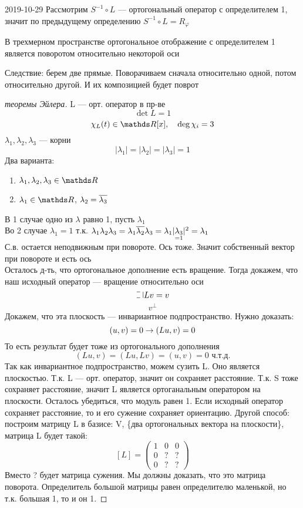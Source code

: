 \documentclass[main]{subfiles}
\begin{document}
\begin{lect}{2019-10-29}
    Рассмотрим $S^{-1} \circ L$ --- ортогональный оператор с определителем 1, значит по предыдущему определению $S^{-1} \circ L = R_{\varphi}$

    \begin{utv}
      В трехмерном пространстве ортогональное отображение с определителем 1 является поворотом относительно некоторой оси
    \end{utv}

    Следствие: берем две прямые. Поворачиваем сначала относительно одной, потом относительно другой. И их композицией будет поврот

    \begin{proof}[теоремы Эйлера]
      L --- орт. оператор в пр-ве
      \[\det L = 1\]
      \[\chi_L(t) \in \R[x],\q \deg \chi_i = 3\]
      $\lambda_1, \lambda_2, \lambda_3$ --- корни
      \[|\lambda_1| = |\lambda_2| = |\lambda_3| = 1\]
      Два варианта:
      \begin{enumerate}
        \item $\lambda_1, \lambda_2, \lambda_3 \in \R$
        \item $\lambda_1 \in \R$, $\lambda_2 = \overline{\lambda_3}$
      \end{enumerate}
      В 1 случае одно из $\lambda$ равно 1, пусть $\lambda_1$\\
      Во 2 случае $\lambda_1 = 1$ т.к. $\lambda_1 \lambda_2 \lambda_3 = \lambda_1 \overline{\lambda_2} \lambda_3 = \lambda_1 |\underset{=1}{\lambda_3}|^2 = \lambda_1$\\
      С.в. остается неподвижным при повороте. Ось тоже. Значит собственный вектор  при повороте и есть ось\\
      Осталось д-ть, что ортогональное дополнение есть вращение. Тогда докажем, что наш исходный оператор --- вращение относительно оси
      \[\letus Lv = v\]
      \[v^{\bot}\]
      Докажем, что эта плоскость --- инвариантное подпространство. Нужно доказать:
      \[(u,v) = 0 \rightarrow (Lu, v) = 0\]
      То есть результат будет тоже из ортогонального дополнения
      \[(Lu,v) = (Lu, Lv) = (u,v) = 0 \text{ ч.т.д.}\]
      Так как инвариантное подпространство, можем сузить L. Оно является плоскостью. Т.к. L --- орт. оператор, значит он сохраняет расстояние. Т.к. S тоже сохраняет расстояние, значит L является ортоганальным оператором на плоскости. Осталось убедиться, что модуль равен 1. Если исходный оператор сохраняет расстояние, то и его сужение сохраняет ориентацию. Другой способ: построим матрицу L в базисе: V, \{два ортогональных вектора на плоскости\}, матрица L будет такой:\\
      \[[L] = \begin{pmatrix}
        1 & 0 & 0\\
        0 & ? & ?\\
        0 & ? & ?
      \end{pmatrix}\]
      Вместо ? будет матрица сужения. Мы должны доказать, что это матрица поворота. Определитель большой матрицы равен определителю маленькой, но т.к. большая 1, то и он 1.


\end{proof}
\end{lect}
\end{document}
